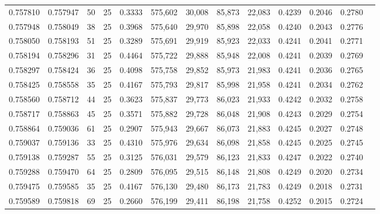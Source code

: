 \begin{tabular}{rrrrrrrrrrrrr}
0.757810 & 0.757947 &    50 &  25 &                                     0.3333 & 575,602 &  30,008 &  85,873 &  22,083 & 0.4239 & 0.2046 & 0.2780 \\
0.757948 & 0.758049 &    38 &  25 &                                     0.3968 & 575,640 &  29,970 &  85,898 &  22,058 & 0.4240 & 0.2043 & 0.2776 \\
0.758050 & 0.758193 &    51 &  25 &                                     0.3289 & 575,691 &  29,919 &  85,923 &  22,033 & 0.4241 & 0.2041 & 0.2771 \\
0.758194 & 0.758296 &    31 &  25 &                                     0.4464 & 575,722 &  29,888 &  85,948 &  22,008 & 0.4241 & 0.2039 & 0.2769 \\
0.758297 & 0.758424 &    36 &  25 &                                     0.4098 & 575,758 &  29,852 &  85,973 &  21,983 & 0.4241 & 0.2036 & 0.2765 \\
0.758425 & 0.758558 &    35 &  25 &                                     0.4167 & 575,793 &  29,817 &  85,998 &  21,958 & 0.4241 & 0.2034 & 0.2762 \\
0.758560 & 0.758712 &    44 &  25 &                                     0.3623 & 575,837 &  29,773 &  86,023 &  21,933 & 0.4242 & 0.2032 & 0.2758 \\
0.758717 & 0.758863 &    45 &  25 &                                     0.3571 & 575,882 &  29,728 &  86,048 &  21,908 & 0.4243 & 0.2029 & 0.2754 \\
0.758864 & 0.759036 &    61 &  25 &                                     0.2907 & 575,943 &  29,667 &  86,073 &  21,883 & 0.4245 & 0.2027 & 0.2748 \\
0.759037 & 0.759136 &    33 &  25 &                                     0.4310 & 575,976 &  29,634 &  86,098 &  21,858 & 0.4245 & 0.2025 & 0.2745 \\
0.759138 & 0.759287 &    55 &  25 &                                     0.3125 & 576,031 &  29,579 &  86,123 &  21,833 & 0.4247 & 0.2022 & 0.2740 \\
0.759288 & 0.759470 &    64 &  25 &                                     0.2809 & 576,095 &  29,515 &  86,148 &  21,808 & 0.4249 & 0.2020 & 0.2734 \\
0.759475 & 0.759585 &    35 &  25 &                                     0.4167 & 576,130 &  29,480 &  86,173 &  21,783 & 0.4249 & 0.2018 & 0.2731 \\
0.759589 & 0.759818 &    69 &  25 &                                     0.2660 & 576,199 &  29,411 &  86,198 &  21,758 & 0.4252 & 0.2015 & 0.2724 \\

\end{tabular}
